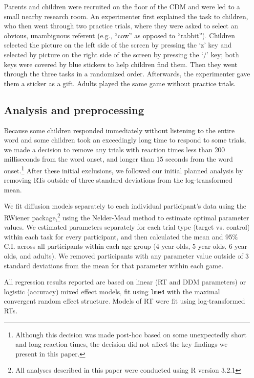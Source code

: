 \documentclass[man, noapacite]{apa2}
\begin{document}
Parents and children were recruited on the floor of the CDM and were led to a small nearby research room.   An experimenter first explained the task to children, who then went through two practice trials, where they were asked to select an obvious, unambiguous referent (e.g., ``cow'' as opposed to ``rabbit''). Children selected the picture on the left side of the screen by pressing the `z' key and selected by picture on the right side of the screen by pressing the `/' key; both keys were covered by blue stickers to help children find them. Then they went through the three tasks in a randomized order. Afterwards, the experimenter gave them a sticker as a gift. Adults played the same game without practice trials.



\subsection{Analysis and preprocessing}

Because some children responded immediately without listening to the entire word and some children took an exceedingly long time to respond to some trials, we made a decision to remove any trials with reaction times less than 200 milliseconds from the word onset, and longer than 15 seconds from the word onset.\footnote{Although this decision was made post-hoc based on some unexpectedly short and long reaction times, the decision did not affect the key findings we present in this paper.} After these initial exclusions, we followed our initial planned analysis by removing RTs outside of three standard deviations from the log-transformed mean.

We fit diffusion models separately to each individual participant's data using the RWiener package,\footnote{All analyses described in this paper were conducted using R version 3.2.1} using the Nelder-Mead method to estimate optimal parameter values. We estimated parameters separately for each trial type (target vs. control) within each task for every participant, and then calculated the mean and 95\% C.I. across all participants within each age group (4-year-olds, 5-year-olds, 6-year-olds, and adults). We removed participants with any parameter value outside of 3 standard deviations from the mean for that parameter within each game.  

All regression results reported are based on linear (RT and DDM parameters) or logistic (accuracy) mixed effect models, fit using \texttt{lme4} with the maximal convergent random effect structure. Models of RT were fit using log-transformed RTs.
\end{document}

